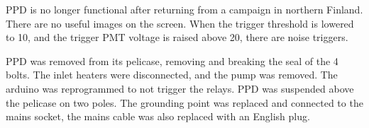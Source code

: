 

PPD is no longer functional after returning from a campaign in northern Finland. There are no useful images on the screen. When the trigger threshold is lowered to 10, and the trigger PMT voltage is raised above 20, there are noise triggers.

PPD was removed from its pelicase, removing and breaking the seal of the 4 bolts. The inlet heaters were disconnected, and the pump was removed. The arduino was reprogrammed to not trigger the relays. PPD was suspended above  the pelicase on two poles. The grounding point was replaced and connected to the mains socket, the mains cable was also replaced with an English plug.
